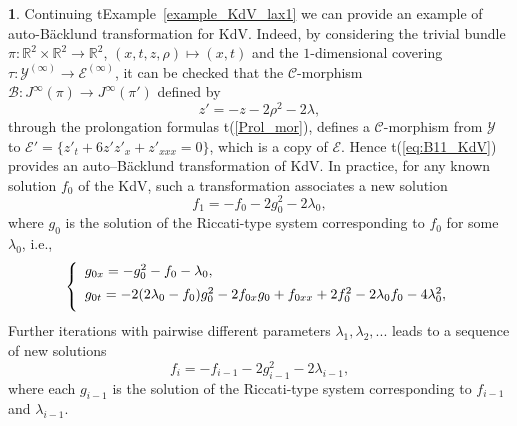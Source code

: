\documentclass[12pt,english]{elsarticle}
\theoremstyle{plain}
\theoremstyle{plain}
\theoremstyle{remark}
\theoremstyle{plain}
\theoremstyle{definition}
\theoremstyle{definition}
\newtheorem{example}[thm]{\protect\examplename}
\providecommand{\examplename}{Example}
\begin{document}
\begin{example}
\label{exa:KdV_B11}%
Continuing t{Example~\ref{example_KdV_lax1}} we can provide an example of
auto-B\"{a}cklund transformation for KdV. Indeed, by considering the trivial
bundle
$\pi :\mathbb{R}^{2}\times \mathbb{R}^{2}\rightarrow \mathbb{R}^{2}$,
$(x,t,z,\rho )\mapsto (x,t)$ and the $1$-dimensional covering
$\tau :\mathcal{Y}^{(\infty )}\longrightarrow \mathcal{E}^{(\infty )}$,
it can be checked that the $\mathcal{C}$-morphism
$\mathcal{B}:J^{\infty}(\pi )\rightarrow J^{\infty}(\pi ')$ defined by
%
\begin{equation}
z'=-z-2\rho ^{2}-2\lambda ,
\label{eq:B11_KdV}
\end{equation}
%
through the prolongation formulas t{(\ref{Prol_mor})}, defines a
$\mathcal{C}$-morphism from $\mathcal{Y}$ to
$\mathcal{E}'=\{z'_{t}+6z'z'_{x}+z'_{xxx}=0\}$, which is a copy of
$\mathcal{E}$. Hence t{(\ref{eq:B11_KdV})} provides an auto--B\"{a}cklund
transformation of KdV. In practice, for any known solution $f_{0}$ of the
KdV, such a transformation associates a new solution
%
\begin{equation*}
f_{1}=-f_{0}-2g_{0}^{2}-2\lambda _{0},
\end{equation*}
%
where $g_{0}$ is the solution of the Riccati-type system corresponding
to $f_{0}$ for some $\lambda _{0}$, i.e.,
%
\begin{equation*}
\left \{
%
\begin{array}{l}
g_{0x}=-g_{0}^{2}-f_{0}-\lambda _{0},
\vspace{5pt}
\\
g_{0t}=-2(2\lambda _{0}-f_{0})g_{0}^{2}-2f_{0x}g_{0}+f_{0xx}+2f_{0}^{2}-2
\lambda _{0}f_{0}-4\lambda _{0}^{2},
\vspace{5pt}
\end{array}
%
\right .
\end{equation*}
%
Further iterations with pairwise different parameters
$\lambda _{1},\lambda _{2},...$ leads to a sequence of new solutions
%
\begin{equation*}
f_{i}=-f_{i-1}-2g_{i-1}^{2}-2\lambda _{i-1},
\end{equation*}
%
where each $g_{i-1}$ is the solution of the Riccati-type system corresponding
to $f_{i-1}$ and $\lambda _{i-1}$.
\end{example}
\end{document}
